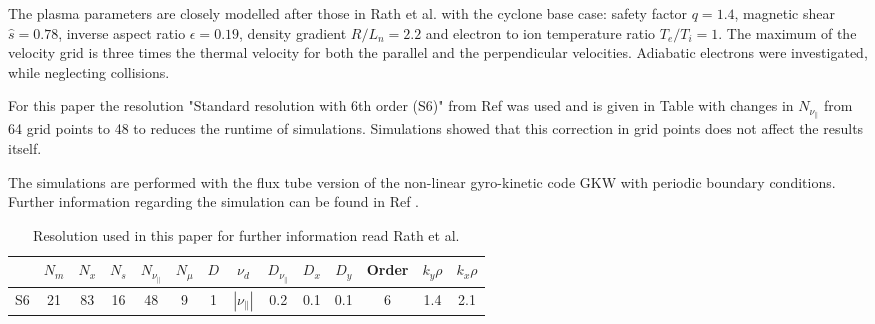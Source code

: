 \documentclass[aip, amsmath, amssymb, reprint, twocolumn]{revtex4-1}
\begin{document}
The plasma parameters are closely modelled after those in Rath et al. \cite{doi:10.1063/1.4961231} with the cyclone base case: safety factor $q = 1.4$, magnetic shear $\hat{s} = 0.78$, inverse aspect ratio $\epsilon = 0.19$, density gradient $R/L_n = 2.2$ and electron to ion temperature ratio $T_e/T_i = 1$. The maximum of the velocity grid is three times the thermal velocity for both the parallel and the perpendicular velocities. Adiabatic electrons were investigated, while neglecting collisions.

For this paper the resolution "Standard resolution with 6th order (S6)" from Ref  was used and is given in Table with changes in $N_{\nu_\parallel}$ from 64 grid points to 48 to reduces the runtime of simulations. Simulations showed that this correction in grid points does not affect the results itself.

The simulations are performed with the flux tube version of the non-linear gyro-kinetic code GKW \cite{Peeters20092650} with periodic boundary conditions.
Further information regarding the simulation can be found in Ref .

\begin{table}
	\begin{ruledtabular}
		\begin{tabular}{l | ccccc | ccccc | c | cc}
			& $N_m$ & $N_x$ & $N_s$ & $N_{\nu_\parallel}$ & $N_\mu$ & $D$ & $\nu_d$           & $D_{\nu_\parallel}$ & $D_x$ & $D_y$ & Order & $k_y\rho$ & $k_x\rho$ \\
			\hline
			S6   & 21    & 83    & 16    & 48                  & 9       & 1   & $|\nu_\parallel|$ & 0.2                 & 0.1   & 0.1   & 6     & 1.4       & 2.1       \\
		\end{tabular}
	\end{ruledtabular}
	\caption{
		Resolution used in this paper for further information read Rath et al. \cite{doi:10.1063/1.4961231} %
	}
	\label{tab:resolution}
\end{table} \bigskip
\end{document}
